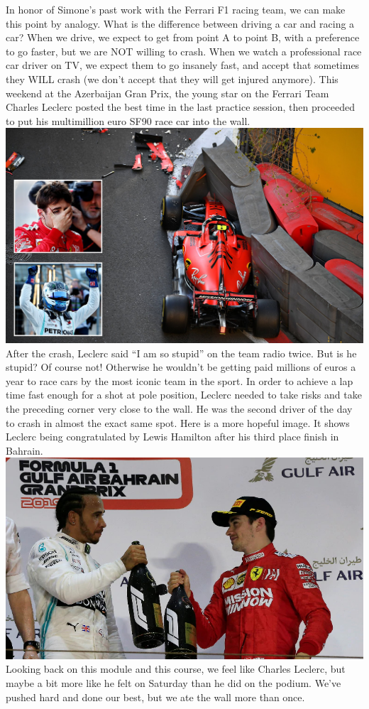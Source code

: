 \documentclass[11pt]{article} %
\begin{document}
In honor of Simone's past work with the Ferrari F1 racing team, we can make this point by analogy.  
What is the difference between driving a car and racing a car?
When we drive, we expect to get from point A to point B, with a preference to go faster, but we are NOT willing to crash.
When we watch a professional race car driver on TV, we expect them to go insanely fast, and accept that sometimes 
they WILL crash (we don't accept that they will get injured anymore).
This weekend at the Azerbaijan Gran Prix, the young star on the Ferrari Team Charles Leclerc 
posted the best time in the last practice session, 
then proceeded to put his multimillion euro SF90 race car into the wall. \\
\includegraphics[width=1.00\textwidth]{pictures/charles_leclerc_crash.jpg}\\
After the crash, Leclerc said ``I am so stupid'' on the team radio twice.
But is he stupid? Of course not!  
Otherwise he wouldn't be getting paid millions of euros a year to race cars
by the most iconic team in the sport.
In order to achieve a lap time fast enough for a shot at pole position, 
Leclerc needed to take risks and take the preceding corner very close to the wall.
He was the second driver of the day to crash in almost the exact same spot.
Here is a more hopeful image.  
It shows Leclerc being congratulated by Lewis Hamilton after his third place finish in Bahrain.\\
\includegraphics[width=1.00\textwidth]{pictures/charles_leclerc_champagne.jpg}
Looking back on this module and this course, we feel like Charles Leclerc, 
but maybe a bit more like he felt on Saturday than he did on the podium.
We've pushed hard and done our best, but we ate the wall more than once.
\end{document}
